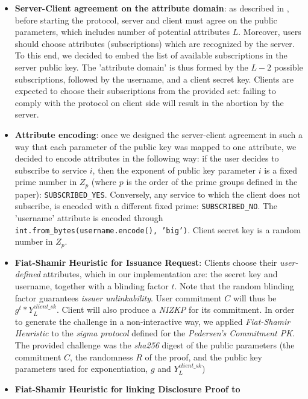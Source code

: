 \documentclass[10pt,conference,compsocconf]{IEEEtran}
\begin{document}
\begin{itemize}
    \item \textbf{Server-Client agreement on the attribute domain}: as described
    in \cite{PS_signature}, before starting the protocol, server and client
    must agree on the public parameters, which includes number of potential attributes $L$.
    Moreover, users should choose attributes (subscriptions) which are recognized by the server.
    To this end, we decided to embed the list of available subscriptions in the server public key.
    The 'attribute domain' is thus formed by the $L-2$ possible subscriptions, followed by the username, and a client secret key.
    Clients are expected to choose their subscriptions from the provided set:
    failing to comply with the protocol on client side will result in the
    abortion by the server.
    \item \textbf{Attribute encoding}: once we designed the server-client
    agreement in such a way that each parameter of the public key was mapped to one attribute, we decided to encode
    attributes in the following way: if the user decides to subscribe to service
    $i$, then the exponent of public key parameter $i$ is a fixed prime number in $Z_p$ (where $p$ is the order of
    the prime groups defined in the paper): \texttt{SUBSCRIBED\_YES}. Conversely, any service to which the client does
    not subscribe, is encoded with a different fixed prime:
    \texttt{SUBSCRIBED\_NO}. The 'username' attribute is encoded through
    \texttt{int.from\_bytes(username.encode(), 'big')}. Client secret key is a random number in $Z_p$.
    \item \textbf{Fiat-Shamir Heuristic for Issuance Request}: Clients choose their \textit{user-defined} attributes,
    which in our implementation are: the secret key and username, together with a
    blinding factor $t$.
    Note that the random blinding factor guarantees \textit{issuer unlinkability}. User commitment $C$ will thus be
    $g^{t}*Y_{L}^{client\_sk}$. Client will also produce a \textit{NIZKP} for its commitment.
    In order to generate the challenge in a non-interactive way, we applied
    \textit{Fiat-Shamir Heuristic} to the \textit{sigma protocol} defined for
    the \textit{Pedersen's Commitment PK}.
    The provided challenge was the \textit{sha256} digest of the public parameters (the
    commitment $C$, the randomness $R$ of the proof, and the public key
    parameters used for exponentiation, $g$ and $Y_{L}^{client\_sk}$)
    \item \textbf{Fiat-Shamir Heuristic for linking Disclosure Proof to
}
\end{itemize}
\end{document}
